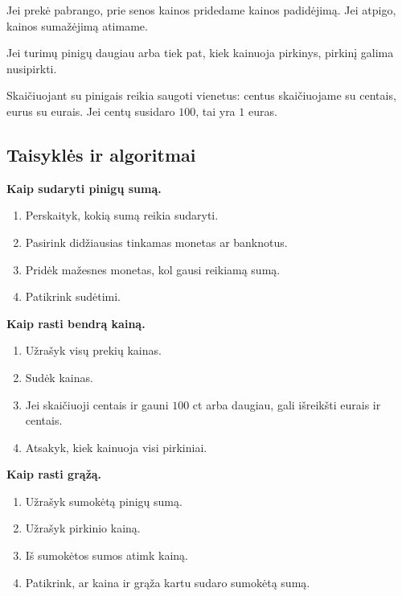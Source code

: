 \begin{savybe}
Jei prekė pabrango, prie senos kainos pridedame kainos padidėjimą. Jei atpigo, kainos sumažėjimą atimame.
\end{savybe}

\begin{savybe}
Jei turimų pinigų daugiau arba tiek pat, kiek kainuoja pirkinys, pirkinį galima nusipirkti.
\end{savybe}

\begin{pastaba}
Skaičiuojant su pinigais reikia saugoti vienetus: centus skaičiuojame su centais, eurus su eurais. Jei centų susidaro \(100\), tai yra \(1\) euras.
\end{pastaba}

\subsection{Taisyklės ir algoritmai}

\textbf{Kaip sudaryti pinigų sumą.}
\begin{enumerate}
\item Perskaityk, kokią sumą reikia sudaryti.
\item Pasirink didžiausias tinkamas monetas ar banknotus.
\item Pridėk mažesnes monetas, kol gausi reikiamą sumą.
\item Patikrink sudėtimi.
\end{enumerate}

\textbf{Kaip rasti bendrą kainą.}
\begin{enumerate}
\item Užrašyk visų prekių kainas.
\item Sudėk kainas.
\item Jei skaičiuoji centais ir gauni \(100\) ct arba daugiau, gali išreikšti eurais ir centais.
\item Atsakyk, kiek kainuoja visi pirkiniai.
\end{enumerate}

\textbf{Kaip rasti grąžą.}
\begin{enumerate}
\item Užrašyk sumokėtą pinigų sumą.
\item Užrašyk pirkinio kainą.
\item Iš sumokėtos sumos atimk kainą.
\item Patikrink, ar kaina ir grąža kartu sudaro sumokėtą sumą.
\end{enumerate}


